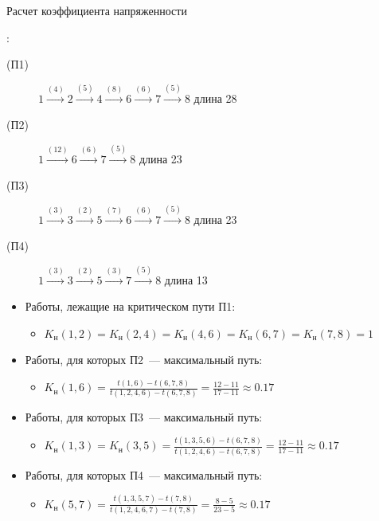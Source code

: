 \documentclass[unicode,11pt,notheorems]{beamer}
\begin{document}
\begin{frame}{Расчет  коэффициента напряженности}

:
\begin{description}
\item[(П1)]
	\alert{$1 \xrightarrow{(4)}  2 \xrightarrow{(5)} 4 \xrightarrow{(8)} 6 \xrightarrow{(6)} 7 \xrightarrow{(5)} 8$}
	\hfill{} длина 28
\item[(П2)] 
	$1 \xrightarrow{(12)}  6 \xrightarrow{(6)} 7 \xrightarrow{(5)} 8$
	\hfill{} длина 23
\item[(П3)] 
	$1 \xrightarrow{(3)} 3 \xrightarrow{(2)} 5 \xrightarrow{(7)}  6\xrightarrow{(6)} 7 \xrightarrow{(5)} 8$
	\hfill{} длина 23
\item[(П4)] 
	$1 \xrightarrow{(3)} 3 \xrightarrow{(2)} 5  \xrightarrow{(3)} 7 \xrightarrow{(5)} 8$
	\hfill{} длина 13
\end{description}

\begin{itemize}
\item 
	Работы, лежащие на критическом пути П1:
	\begin{itemize}
	\item[]
	$
		K_\text{н}(1,2)=K_\text{н}(2,4)=K_\text{н}(4,6)=K_\text{н}(6,7)=K_\text{н}(7,8)=1
	$
	\end{itemize}
\item 
	Работы, для которых П2~--- максимальный путь:
	\begin{itemize}
	\item[]
		$K_\text{н}(1,6)
		= \frac{t(1,6)-t(6,7,8)}{t(1,2,4,6)-t(6,7,8)}
		=\frac{12-11}{17-11}
		\approx 0.17 $	
	\end{itemize}
\item 
	Работы, для которых П3~--- максимальный путь:
	\begin{itemize}
	\item[]
		$K_\text{н}(1,3)=K_\text{н}(3,5)
		= \frac{t(1,3,5,6)-t(6,7,8)}{t(1,2,4,6)-t(6,7,8)}
		=\frac{12-11}{17-11}
		\approx 0.17 $	
	\end{itemize}
\item 
	Работы, для которых П4~--- максимальный путь:
	\begin{itemize}
	\item[]
		$K_\text{н}(5,7)
		= \frac{t(1,3,5,7)-t(7,8)}{t(1,2,4,6,7)-t(7,8)}
		=\frac{8-5}{23-5} 
		\approx 0.17 $	
	\end{itemize}

\end{itemize}

\end{frame}
\end{document}
